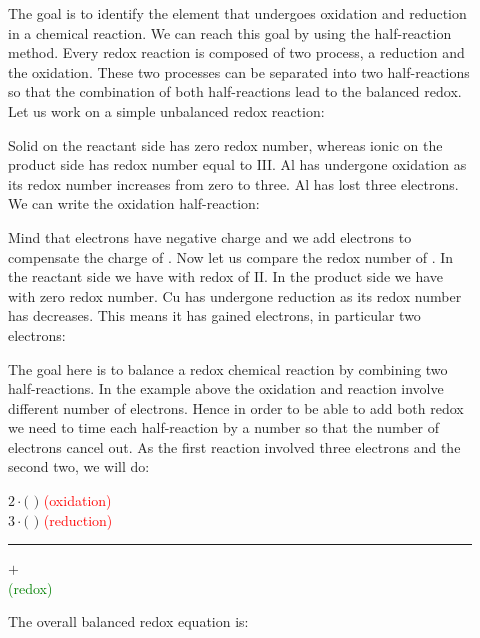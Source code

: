 \documentclass[main.tex]{subfiles} %
\begin{document}
\begin{description}
\item[] The goal is to identify the element that undergoes oxidation and reduction in a chemical reaction. 
We can reach this goal by using the half-reaction method. Every redox reaction is composed of two process, a reduction and the oxidation. These two processes can be separated into two half-reactions so that the combination of both half-reactions lead to the balanced redox. Let us work on a simple unbalanced redox reaction:
\begin{center}\end{center}
Solid  on the reactant side has zero redox number, whereas ionic  on the product side has redox number equal to $\text{III}$. Al has undergone oxidation as its redox number increases from zero to three. Al has lost three electrons. We can write the oxidation half-reaction:
\begin{center}\end{center}
Mind that electrons have negative charge and we add electrons to compensate the charge of . 
Now let us compare the redox number of . In the reactant side we have  with redox of $\text{II}$. In the product side we have  with zero redox number. Cu has undergone reduction as its redox number has decreases. This means it has gained electrons, in particular two electrons: 
\begin{center}\end{center}

 \item[] The goal here is to balance a redox chemical reaction by combining two half-reactions. In the example above the oxidation and reaction involve different number of electrons. Hence in order to be able to add both redox we need to time each half-reaction by a number so that the number of electrons cancel out. As the first reaction involved three electrons and the second two, we will do:
 \begin{center}
$2\cdot \big($  $\big)$ \hspace*{0pt}\hfill  \textcolor{red}{ (oxidation) }\\
$3\cdot \big($  $\big)$ \hspace*{0pt}\hfill  \textcolor{red}{ (reduction) } \\
\rule{12cm}{0.4pt}$+$\\
  \hspace*{0pt}\hfill  \textcolor{green}{ (redox) } \\
 \end{center}
The overall balanced redox equation is:


\end{description}
\end{document}
